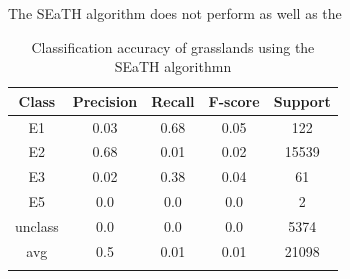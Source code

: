 \documentclass[authoryear, review,12pt,number]{elsarticle}
\begin{document}
The SEaTH algorithm does not perform as well as the 
\begin{table}
\begin{tabular}{c c c c c}
Class & Precision & Recall & F-score & Support\\
\hline
E1 & 0.03 & 0.68 & 0.05 & 122\\
E2 & 0.68 & 0.01 & 0.02 & 15539\\
E3 & 0.02 & 0.38 & 0.04 & 61\\
E5 & 0.0 & 0.0 & 0.0 & 2\\
unclass & 0.0 & 0.0 & 0.0 & 5374\\
avg & 0.5 & 0.01 & 0.01 & 21098\\
\label{fig_seath_lvl2_classification}
\end{tabular}
\caption{Classification accuracy of grasslands using the SEaTH algorithmn}
\end{table}
\end{document}
